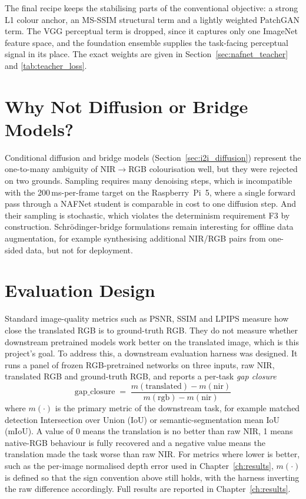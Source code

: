 The final recipe keeps the stabilising parts of the conventional objective: a strong L1 colour anchor, an MS-SSIM structural term and a lightly weighted PatchGAN term. The VGG perceptual term is dropped, since it captures only one ImageNet feature space, and the foundation ensemble supplies the task-facing perceptual signal in its place. The exact weights are given in Section~\ref{sec:nafnet_teacher} and \autoref{tab:teacher_loss}.

\section{Why Not Diffusion or Bridge Models?}
\label{sec:why_not_diffusion}

Conditional diffusion and bridge models (Section~\ref{sec:i2i_diffusion}) represent the one-to-many ambiguity of NIR$\rightarrow$RGB colourisation well, but they were rejected on two grounds. Sampling requires many denoising steps, which is incompatible with the 200\,ms-per-frame target on the Raspberry~Pi~5, where a single forward pass through a NAFNet student is comparable in cost to one diffusion step. And their sampling is stochastic, which violates the determinism requirement F3 by construction. Schr\"odinger-bridge formulations remain interesting for offline data augmentation, for example synthesising additional NIR/RGB pairs from one-sided data, but not for deployment.

\section{Evaluation Design}
\label{sec:design_evaluation}

Standard image-quality metrics such as PSNR, SSIM and LPIPS measure how close the translated RGB is to ground-truth RGB. They do not measure whether downstream pretrained models work better on the translated image, which is this project's goal. To address this, a downstream evaluation harness was designed. It runs a panel of frozen RGB-pretrained networks on three inputs, raw NIR, translated RGB and ground-truth RGB, and reports a per-task \emph{gap closure}
\[
\text{gap\_closure} \;=\; \frac{m(\text{translated}) - m(\text{nir})}{m(\text{rgb}) - m(\text{nir})}
\]
where $m(\cdot)$ is the primary metric of the downstream task, for example matched detection Intersection over Union (IoU) or semantic-segmentation mean IoU (mIoU). A value of 0 means the translation is no better than raw NIR, 1 means native-RGB behaviour is fully recovered and a negative value means the translation made the task worse than raw NIR. For metrics where lower is better, such as the per-image normalised depth error used in Chapter~\ref{ch:results}, $m(\cdot)$ is defined so that the sign convention above still holds, with the harness inverting the raw difference accordingly. Full results are reported in Chapter~\ref{ch:results}.

